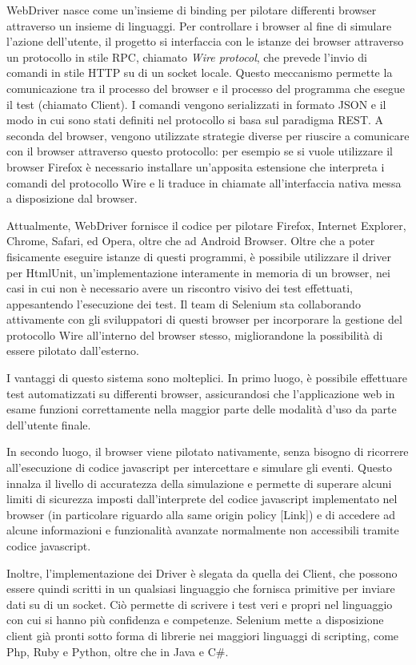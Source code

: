 WebDriver nasce come un'insieme di binding per pilotare differenti browser attraverso un insieme di linguaggi. Per controllare i browser al fine di simulare l'azione dell'utente, il progetto si interfaccia con le istanze dei browser attraverso un protocollo in stile RPC, chiamato \emph{Wire protocol}, che prevede l'invio di comandi in stile HTTP su di un socket locale. Questo meccanismo permette la comunicazione tra il processo del browser e il processo del programma che esegue il test (chiamato Client). I comandi vengono serializzati in formato JSON e il modo in cui sono stati definiti nel protocollo si basa sul paradigma REST. A seconda del browser, vengono utilizzate strategie diverse per riuscire a comunicare con il browser attraverso questo protocollo: per esempio se si vuole utilizzare il browser Firefox è necessario installare un'apposita estensione che interpreta i comandi del protocollo Wire e li traduce in chiamate all'interfaccia nativa messa a disposizione dal browser. 

Attualmente, WebDriver fornisce il codice per pilotare Firefox, Internet Explorer, Chrome, Safari, ed Opera, oltre che ad Android Browser. Oltre che a poter fisicamente eseguire istanze di questi programmi, è possibile utilizzare il driver per HtmlUnit, un'implementazione interamente in memoria di un browser, nei casi in cui non è necessario avere un riscontro visivo dei test effettuati, appesantendo l'esecuzione dei test. Il team di Selenium sta collaborando attivamente con gli sviluppatori di questi browser per incorporare la gestione del protocollo Wire all'interno del browser stesso, migliorandone la possibilità di essere pilotato dall'esterno. 

I vantaggi di questo sistema sono molteplici. In primo luogo, è possibile effettuare test automatizzati su differenti browser, assicurandosi che l'applicazione web in esame funzioni correttamente nella maggior parte delle modalità d'uso da parte dell'utente finale. 

In secondo luogo, il browser viene pilotato nativamente, senza bisogno di ricorrere all'esecuzione di codice javascript per intercettare e simulare gli eventi. Questo innalza il livello di accuratezza della simulazione e permette di superare alcuni limiti di sicurezza imposti dall'interprete del codice javascript implementato nel browser (in particolare riguardo alla same origin policy [Link]) e di accedere ad alcune informazioni e funzionalità avanzate normalmente non accessibili tramite codice javascript.

Inoltre, l'implementazione dei Driver è slegata da quella dei Client, che possono essere quindi scritti in un qualsiasi linguaggio che fornisca primitive per inviare dati su di un socket. Ciò permette di scrivere i test veri e propri nel linguaggio con cui si hanno più confidenza e competenze. Selenium mette a disposizione client già pronti sotto forma di librerie nei maggiori linguaggi di scripting, come Php, Ruby e Python, oltre che in Java e C\#.


